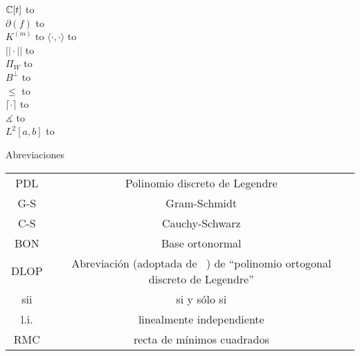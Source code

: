  $\mathbb{C}[t]$ \hbox to\linewidth{\hfil Anillo de polinomios con coeficientes complejos \hfil}  \\
 $\partial(f)$ \hbox to\linewidth{\hfil Grado de un polinomio $f$ \hfil}   \\
 $K^{(m)}$ \hbox to  
 $\langle \cdot, \cdot \rangle$ \hbox to\linewidth{\hfil Producto punto \hfil}  \\
 $|| \cdot ||$ \hbox to\linewidth{\hfil Norma \hfil} \\
 $\Pi_{W}$ \hbox to\linewidth{\hfil Proyección sobre el subespacio cerrado $W$ \hfil}  \\
 $B^{\perp}$ \hbox to\linewidth{\hfil Complemento ortogonal de un subconjunto $B$ de un espacio con producto punto. \hfil}  \\
 $\leq$ \hbox to\linewidth{\hfil Relación ``ser subespacio de'' \hfil}   \\
 $\lceil \cdot \rceil$ \hbox to\linewidth{\hfil Función techo \hfil}  \\
 $\measuredangle$ \hbox to\linewidth{\hfil Ángulo \hfil}  \\
 $L^{2}[a,b]$ \hbox to \\



\vspace{0.5cm}

\begin{center}
\huge{Abreviaciones}
\end{center}

\vspace{0.5cm}

\begin{tabular}{ c c }
 PDL & Polinomio discreto de Legendre \\
 G-S & Gram-Schmidt \\
 C-S & Cauchy-Schwarz \\
 BON & Base ortonormal \\
 DLOP & Abreviación (adoptada de ~\cite{Neuman})
 de ``polinomio ortogonal discreto de Legendre'' \\
 sii & si y sólo si \\
 l.i. & linealmente independiente \\
 RMC & recta de mínimos cuadrados
\end{tabular}




\newpage